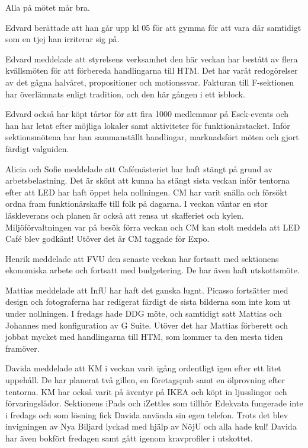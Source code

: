 \documentclass[10pt]{article}
\begin{document}
\begin{paragrafer}
\begin{paragrafer}

Alla på mötet mår bra. 

Edvard berättade att han går upp kl 05 för att gymma för att vara där samtidigt som en tjej han irriterar sig på.

Edvard meddelade att styrelsens verksamhet den här veckan har bestått av flera kvällsmöten för att förbereda handlingarna till HTM. Det har varåt redogörelser av det gågna halvåret, propositioner och motionssvar. 
Fakturan till F-sektionen har överlämnats enligt tradition, och den här gången i ett isblock. 

Edvard också har köpt tårtor för att fira 1000 medlemmar på Esek-events och han har letat efter möjliga lokaler samt aktiviteter för funktionärstacket. Inför sektionsmötena har han sammanställt handlingar, marknadsfört möten och gjort färdigt valguiden. 

Alicia och Sofie meddelade att Cafémästeriet har haft stängt på grund av arbetsbelastning. Det är skönt att kunna ha stängt sista veckan inför tentorna efter att LED har haft öppet hela nollningen. CM har varit snälla och försökt ordna fram funktionärskaffe till folk på dagarna. I veckan väntar en stor läskleverans och planen är också att rensa ut skafferiet och kylen. 
Miljöförvaltningen var på besök förra veckan och CM kan stolt meddela att LED Café blev godkänt! Utöver det är CM taggade för Expo. 

Henrik meddelade att FVU den senaste veckan har fortsatt med sektionens ekonomiska arbete och fortsatt med budgetering. De har även haft utskottsmöte.

Mattias meddelade att InfU har haft det ganska lugnt. Picasso fortsätter med design och fotograferna har redigerat färdigt de sista bilderna som inte kom ut under nollningen. I fredags hade DDG möte, och samtidigt satt Mattias och Johannes med konfiguration av G Suite. 
Utöver det har Mattias förberett och jobbat mycket med handlingarna till HTM, som kommer ta den mesta tiden framöver. 

Davida meddelade att KM i veckan varit igång ordentligt igen efter ett litet uppehåll. De har planerat två gillen, en företagspub samt en ölprovning efter tentorna. KM har också varit på äventyr på IKEA och köpt in ljusslingor och förvaringslådor. Sektionens iPads och iZettles som tillhör Edekvata fungerade inte i fredags och som lösning fick Davida använda sin egen telefon. Trots det blev invigningen av Nya Biljard lyckad med hjälp av NöjU och alla hade kul! Davida har även bokfört fredagen samt gått igenom kravprofiler i utskottet. 


\end{paragrafer}
\end{paragrafer}
\end{document}
